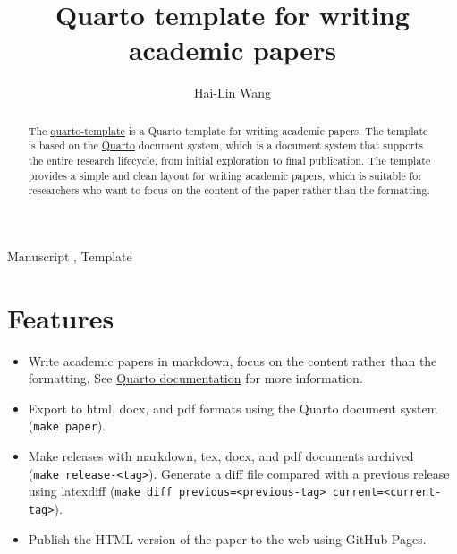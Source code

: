 \documentclass[
  authoryear,
  review,
  3p,
  onecolumn]{elsarticle}
\providecommand{\tightlist}{%
  \setlength{\itemsep}{0pt}\setlength{\parskip}{0pt}}\usepackage{longtable,booktabs,array}
\begin{document}
\begin{frontmatter}
\title{Quarto template for writing academic papers}
\author[1,2]{Hai-Lin Wang%
%
}



        
\begin{abstract}
The \href{https://github.com/haiiliin/quarto-template}{quarto-template}
is a Quarto template for writing academic papers. The template is based
on the \href{https://quarto.org}{Quarto} document system, which is a
document system that supports the entire research lifecycle, from
initial exploration to final publication. The template provides a simple
and clean layout for writing academic papers, which is suitable for
researchers who want to focus on the content of the paper rather than
the formatting.
\end{abstract}





\begin{keyword}
    Manuscript \sep 
    Template
\end{keyword}
\end{frontmatter}
    
\linenumbers


\section{Features}\label{features}

\begin{itemize}
\tightlist
\item
  Write academic papers in markdown, focus on the content rather than
  the formatting. See \href{https://quarto.org/docs/guide/}{Quarto
  documentation} for more information.
\item
  Export to html, docx, and pdf formats using the Quarto document system
  (\texttt{make\ paper}).
\item
  Make releases with markdown, tex, docx, and pdf documents archived
  (\texttt{make\ release-\textless{}tag\textgreater{}}). Generate a diff
  file compared with a previous release using latexdiff
  (\texttt{make\ diff\ previous=\textless{}previous-tag\textgreater{}\ current=\textless{}current-tag\textgreater{}}).
\item
  Publish the HTML version of the paper to the web using GitHub Pages.
\end{itemize}
\end{document}
